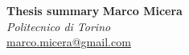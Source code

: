 \Large{\textbf{Thesis summary}} \hfill \large{\textbf{Marco Micera}} \\
\normalsize \phantom{} \hfill \textit{Politecnico di Torino} \\
\normalsize \phantom{} \hfill \href{mailto:marco.micera@gmail.com}{marco.micera@gmail.com}
